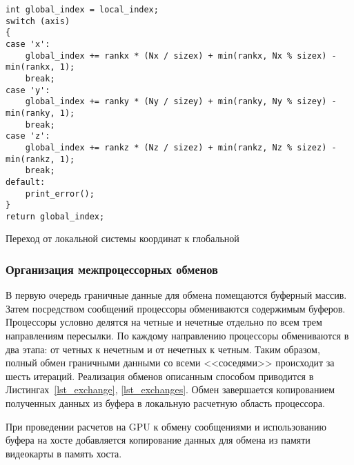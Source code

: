 \begin{listing}
\begin{verbatim}
int global_index = local_index;
switch (axis)
{
case 'x':
    global_index += rankx * (Nx / sizex) + min(rankx, Nx % sizex) - min(rankx, 1);
    break;
case 'y':
    global_index += ranky * (Ny / sizey) + min(ranky, Ny % sizey) - min(ranky, 1);
    break;
case 'z':
    global_index += rankz * (Nz / sizez) + min(rankz, Nz % sizez) - min(rankz, 1);
    break;
default:
    print_error();
}
return global_index;
\end{verbatim}
\caption{Переход от локальной системы координат к глобальной}
\label{lst_localglobal}
\end{listing}

\subsubsection*{Организация межпроцессорных обменов}

В первую очередь граничные данные для обмена помещаются
буферный массив. Затем посредством сообщений процессоры
обмениваются содержимым буферов. Процессоры условно делятся
на четные и нечетные отдельно по всем трем направлениям пересылки.
По каждому направлению процессоры обмениваются в два этапа:
от четных к нечетным и от нечетных к четным. Таким образом,
полный обмен граничными данными со всеми <<соседями>> происходит
за шесть итераций. Реализация обменов описанным способом 
приводится в Листингах~\ref{lst_exchange}, \ref{lst_exchanges}. 
Обмен завершается копированием
полученных данных из буфера в локальную расчетную область процессора.

При проведении расчетов на GPU к обмену сообщениями и использованию
буфера на хосте
добавляется копирование данных для обмена из памяти видеокарты
в память хоста.

